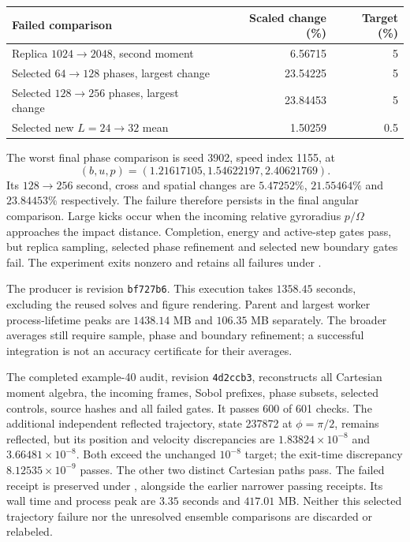 \documentclass[11pt,letterpaper]{article}
\begin{document}
\begin{center}
\begin{tabular}{lrr}
\toprule
Failed comparison & Scaled change (\%) & Target (\%)\\
\midrule
Replica $1024\to2048$, second moment & 6.56715 & 5\\
Selected $64\to128$ phases, largest change & 23.54225 & 5\\
Selected $128\to256$ phases, largest change & 23.84453 & 5\\
Selected new $L=24\to32$ mean & 1.50259 & 0.5\\
\bottomrule
\end{tabular}
\end{center}
The worst final phase comparison is seed 3902, speed index 1155, at
\[
 (b,u,p)=(1.21617105,1.54622197,2.40621769).
\]
Its
$128\to256$ second, cross and spatial changes are $5.47252\%$,
$21.55464\%$ and $23.84453\%$ respectively. The failure therefore
persists in the final angular comparison. Large kicks occur when the
incoming relative gyroradius $p/\Omega$ approaches the impact distance.
Completion, energy and active-step gates pass, but replica sampling,
selected phase refinement and selected new boundary gates fail. The
experiment exits nonzero and retains all failures under
.

The producer is revision \texttt{bf727b6}. This execution takes
$1358.45$ seconds, excluding the reused solves and figure rendering.
Parent and largest worker process-lifetime peaks are $1438.14$ MB and
$106.35$ MB separately. The broader averages still require sample,
phase and boundary refinement; a successful integration is not an
accuracy certificate for their averages.

The completed example-40 audit, revision \texttt{4d2ccb3}, reconstructs
all Cartesian moment algebra, the incoming frames, Sobol prefixes,
phase subsets, selected controls, source hashes and all failed gates.
It passes 600 of 601 checks. The additional independent reflected
trajectory, state 237872 at $\phi=\pi/2$, remains reflected, but
its position and velocity discrepancies are $1.83824\times10^{-8}$ and
$3.66481\times10^{-8}$. Both exceed the unchanged $10^{-8}$ target;
the exit-time discrepancy $8.12535\times10^{-9}$ passes. The other two
distinct Cartesian paths pass. The failed receipt is preserved under
, alongside the earlier
narrower passing receipts. Its wall time and process peak are $3.35$ seconds
and $417.01$ MB. Neither this selected trajectory failure nor the unresolved
ensemble comparisons are discarded or relabeled.
\end{document}
